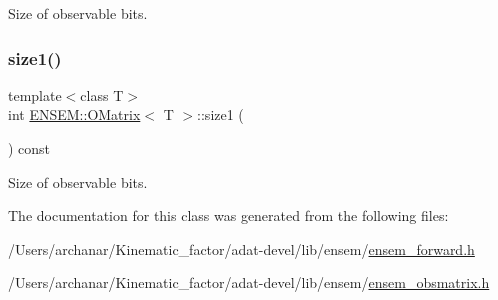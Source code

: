 Size of observable bits. 

\mbox{\label{classENSEM_1_1OMatrix_a850b4d2a93be69f82df4a2d0165bc397}} 
\subsubsection{\texorpdfstring{size1()}{size1()}\hspace{0.1cm}{\footnotesize\ttfamily [3/3]}}
{\footnotesize\ttfamily template$<$class T$>$ \\
int \mbox{\hyperlink{classENSEM_1_1OMatrix}{E\+N\+S\+E\+M\+::\+O\+Matrix}}$<$ T $>$\+::size1 (\begin{DoxyParamCaption}{ }\end{DoxyParamCaption}) const\hspace{0.3cm}{\ttfamily [inline]}}



Size of observable bits. 



The documentation for this class was generated from the following files\+:\begin{DoxyCompactItemize}
\item 
/\+Users/archanar/\+Kinematic\+\_\+factor/adat-\/devel/lib/ensem/\mbox{\hyperlink{adat-devel_2lib_2ensem_2ensem__forward_8h}{ensem\+\_\+forward.\+h}}\item 
/\+Users/archanar/\+Kinematic\+\_\+factor/adat-\/devel/lib/ensem/\mbox{\hyperlink{adat-devel_2lib_2ensem_2ensem__obsmatrix_8h}{ensem\+\_\+obsmatrix.\+h}}\end{DoxyCompactItemize}
